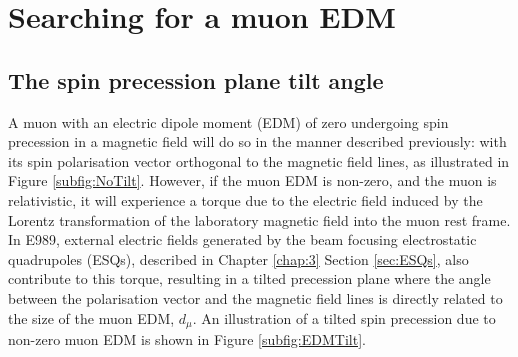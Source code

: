

\section{Searching for a muon EDM}

\subsection{The spin precession plane tilt angle}

A muon with an electric dipole moment (EDM) of zero undergoing spin precession in a magnetic field will do so in the manner described previously: with its spin polarisation vector orthogonal to the magnetic field lines, as illustrated in Figure \ref{subfig:NoTilt}. However, if the muon EDM is non-zero, and the muon is relativistic, it will experience a torque due to the electric field induced by the Lorentz transformation of the laboratory magnetic field into the muon rest frame. In E989, external electric fields generated by the beam focusing electrostatic quadrupoles (ESQs), described in Chapter \ref{chap:3} Section \ref{sec:ESQs}, also contribute to this torque, resulting in a tilted precession plane where the angle between the polarisation vector and the magnetic field lines is directly related to the size of the muon EDM, $d_{\mu}$. An illustration of a tilted spin precession due to non-zero muon EDM is shown in Figure \ref{subfig:EDMTilt}.

